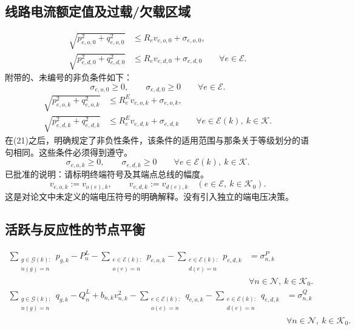 \documentclass{article}
\begin{document}
\subsection*{线路电流额定值及过载/欠载区域}
\begin{equation}
\begin{aligned}
\sqrt{p_{e,o,0}^{2}+q_{e,o,0}^{2}}&\leq R_ev_{e,o,0}+\sigma_{e,o,0},\\
\sqrt{p_{e,d,0}^{2}+q_{e,d,0}^{2}}&\leq R_ev_{e,d,0}+\sigma_{e,d,0}
\qquad\forall e\in\mathcal E.
\end{aligned}\tag{20}
\end{equation}
附带的、未编号的非负条件如下：
\[
\sigma_{e,o,0}\geq0,\qquad\sigma_{e,d,0}\geq0
\qquad\forall e\in\mathcal E.
\]
\begin{equation}
\begin{aligned}
\sqrt{p_{e,o,k}^{2}+q_{e,o,k}^{2}}&\leq R_e^Ev_{e,o,k}+\sigma_{e,o,k},\\
\sqrt{p_{e,d,k}^{2}+q_{e,d,k}^{2}}&\leq R_e^Ev_{e,d,k}+\sigma_{e,d,k}
\qquad\forall e\in\mathcal E(k),\ k\in\mathcal K.
\end{aligned}\tag{21}
\end{equation}
在(21)之后，明确规定了非负性条件，该条件的适用范围与那条关于等级划分的语句相同。这些条件必须得到遵守。
\[
\sigma_{e,o,k}\geq0,\qquad\sigma_{e,d,k}\geq0
\qquad\forall e\in\mathcal E(k),\ k\in\mathcal K.
\]
已批准的说明：请标明终端符号及其端点总线的幅度。
\[
 v_{e,o,k}:=v_{o(e),k},\qquad v_{e,d,k}:=v_{d(e),k}
 \quad(e\in\mathcal E,\ k\in\mathcal K_0).
\]
这是对论文中未定义的端电压符号的明确解释。没有引入独立的端电压决策。

\subsection*{活跃与反应性的节点平衡}
\begin{equation}
\begin{aligned}
\sum_{\substack{g\in\mathcal G(k):\\n(g)=n}}p_{g,k}-P_n^L
-\sum_{\substack{e\in\mathcal E(k):\\o(e)=n}}p_{e,o,k}
-\sum_{\substack{e\in\mathcal E(k):\\d(e)=n}}p_{e,d,k}
&=\sigma_{n,k}^P\\[-1mm]
&\forall n\in\mathcal N,\ k\in\mathcal K_0.
\end{aligned}\tag{22}
\end{equation}
\begin{equation}
\begin{aligned}
\sum_{\substack{g\in\mathcal G(k):\\n(g)=n}}q_{g,k}-Q_n^L+b_{n,k}v_{n,k}^{2}
-\sum_{\substack{e\in\mathcal E(k):\\o(e)=n}}q_{e,o,k}
-\sum_{\substack{e\in\mathcal E(k):\\d(e)=n}}q_{e,d,k}
&=\sigma_{n,k}^Q\\[-1mm]
&\forall n\in\mathcal N,\ k\in\mathcal K_0.
\end{aligned}\tag{23}
\end{equation}
\end{document}
